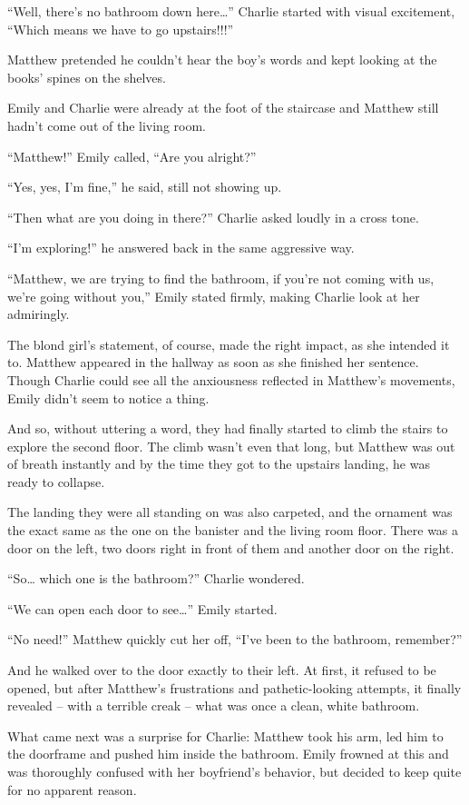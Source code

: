 “Well, there’s no bathroom down here…” Charlie started with visual excitement, “Which means we have to go upstairs!!!”

Matthew pretended he couldn’t hear the boy’s words and kept looking at the books’ spines on the shelves.

Emily and Charlie were already at the foot of the staircase and Matthew still hadn’t come out of the living room.

“Matthew!” Emily called, “Are you alright?”

“Yes, yes, I’m fine,” he said, still not showing up.

“Then what are you doing in there?” Charlie asked loudly in a cross tone.

“I’m exploring!” he answered back in the same aggressive way.

“Matthew, we are trying to find the bathroom, if you’re not coming with us, we’re going without you,” Emily stated firmly, making Charlie look at her admiringly.

The blond girl’s statement, of course, made the right impact, as she intended it to. Matthew appeared in the hallway as soon as she finished her sentence. Though Charlie could see all the anxiousness reflected in Matthew’s movements, Emily didn’t seem to notice a thing.

And so, without uttering a word, they had finally started to climb the stairs to explore the second floor. The climb wasn’t even that long, but Matthew was out of breath instantly and by the time they got to the upstairs landing, he was ready to collapse.

The landing they were all standing on was also carpeted, and the ornament was the exact same as the one on the banister and the living room floor. There was a door on the left, two doors right in front of them and another door on the right.

“So… which one is the bathroom?” Charlie wondered.

“We can open each door to see…” Emily started.

“No need!” Matthew quickly cut her off, “I’ve been to the bathroom, remember?”

And he walked over to the door exactly to their left. At first, it refused to be opened, but after Matthew’s frustrations and pathetic-looking attempts, it finally revealed – with a terrible creak – what was once a clean, white bathroom.

What came next was a surprise for Charlie: Matthew took his arm, led him to the doorframe and pushed him inside the bathroom. Emily frowned at this and was thoroughly confused with her boyfriend’s behavior, but decided to keep quite for no apparent reason.


